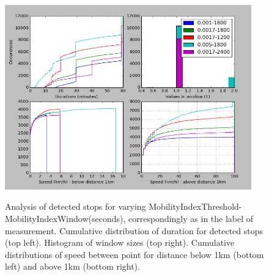\begin{figure}[!ht]
	\centering
	\includegraphics[width=0.95\textwidth]{images/mob_index_analy2.png}\\
	\caption{ Analysis of detected stops for varying MobilityIndexThreshold-MobilityIndexWindow(seconds), correspondingly as in the label of measurement. Cumulative distribution of duration for detected stops (top left). Histogram of window sizes (top right). Cumulative distributions of speed between point for distance below 1km (bottom left) and above 1km (bottom right). }
	\label{fig:mob_index_analy2}
\end{figure}
\FloatBarrier 
 
